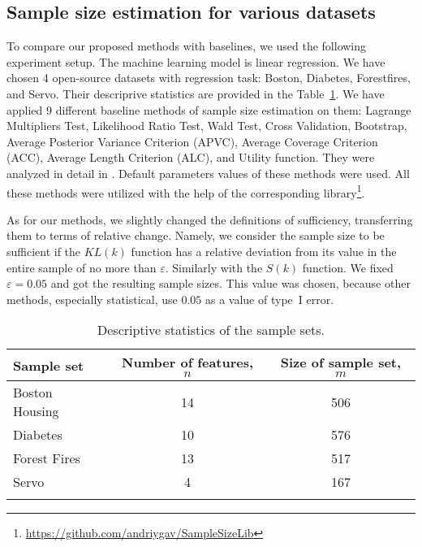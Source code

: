 \documentclass[sn-mathphys-num]{sn-jnl}%
\begin{document}
\subsection{Sample size estimation for various datasets}

To compare our proposed methods with baselines, we used the following experiment setup. The machine learning model is linear regression. We have chosen 4 open-source datasets with regression task: Boston, Diabetes, Forestfires, and Servo. Their descriprive statistics are provided in the Table~\ref{table:descr}. We have applied 9 different baseline methods of sample size estimation on them: Lagrange Multipliers Test, Likelihood Ratio Test, Wald Test, Cross Validation, Bootstrap, Average Posterior Variance Criterion (APVC), Average Coverage Criterion (ACC), Average Length Criterion (ALC), and Utility function. They were analyzed in detail in \cite{Grabovoy2022}. Default parameters values of these methods were used. All these methods were utilized with the help of the corresponding library\footnote{\href{https://github.com/andriygav/SampleSizeLib}{https://github.com/andriygav/SampleSizeLib}}. 

As for our methods, we slightly changed the definitions of sufficiency, transferring them to terms of relative change. Namely, we consider the sample size to be sufficient if the $KL(k)$ function has a relative deviation from its value in the entire sample of no more than $\varepsilon$. Similarly with the $S(k)$ function. We fixed $\varepsilon=0.05$ and got the resulting sample sizes. This value was chosen, because other methods, especially statistical, use $0.05$ as a value of type~I error.

\begin{table}[ht]
    \centering
    \caption{Descriptive statistics of the sample sets.}\label{table:descr}
    \begin{tabular}{lcc}
    \hline
        \toprule
        Sample set & Number of features, $n$ & Size of sample set, $m$ \\ 
        \midrule
        Boston Housing & 14 & 506 \\ 
        Diabetes & 10 & 576 \\ 
        Forest Fires & 13 & 517 \\ 
        Servo & 4 & 167 \\ 
        \botrule
    \end{tabular}
\end{table}
\end{document}
